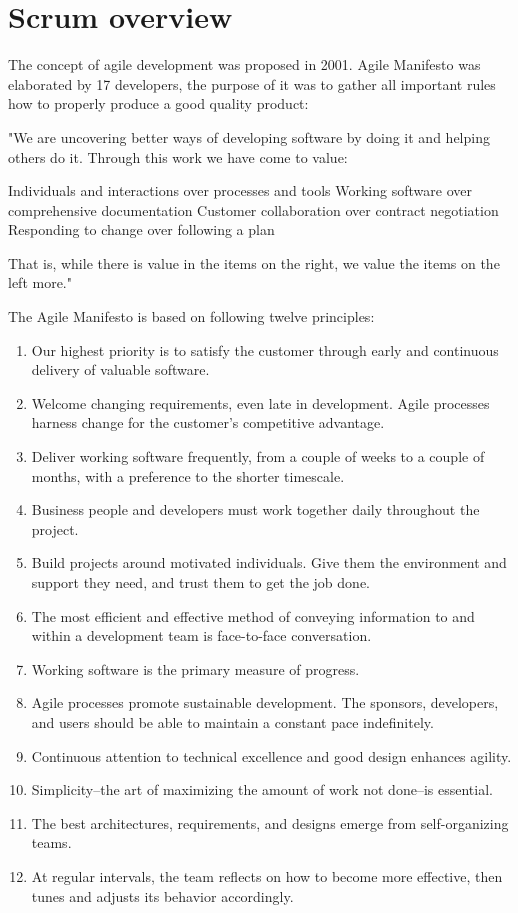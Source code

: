 \chapter{Scrum overview}
The concept of agile development was proposed in 2001. Agile Manifesto was elaborated by 17 developers, the purpose of it was to gather all important rules how to properly produce a good quality product:

"We are uncovering better ways of developing
software by doing it and helping others do it.
Through this work we have come to value:

Individuals and interactions over processes and tools \hfill \break
Working software over comprehensive documentation \hfill \break
Customer collaboration over contract negotiation \hfill \break
Responding to change over following a plan \hfill \break

That is, while there is value in the items on
the right, we value the items on the left more." \cite{AgileManifesto}

The Agile Manifesto is based on following twelve principles:

\begin{enumerate}
    \item Our highest priority is to satisfy the customer
through early and continuous delivery
of valuable software.
\item Welcome changing requirements, even late in 
development. Agile processes harness change for 
the customer's competitive advantage.
\item Deliver working software frequently, from a 
couple of weeks to a couple of months, with a 
preference to the shorter timescale.
\item Business people and developers must work 
together daily throughout the project.
\item Build projects around motivated individuals. 
Give them the environment and support they need, 
and trust them to get the job done.
\item The most efficient and effective method of 
conveying information to and within a development 
team is face-to-face conversation.
\item Working software is the primary measure of progress.
\item Agile processes promote sustainable development. 
The sponsors, developers, and users should be able 
to maintain a constant pace indefinitely.
\item Continuous attention to technical excellence 
and good design enhances agility.
\item Simplicity--the art of maximizing the amount 
of work not done--is essential.
\item The best architectures, requirements, and designs 
emerge from self-organizing teams.
\item At regular intervals, the team reflects on how 
to become more effective, then tunes and adjusts 
its behavior accordingly.\cite{AgileManifesto}
\end{enumerate} 

